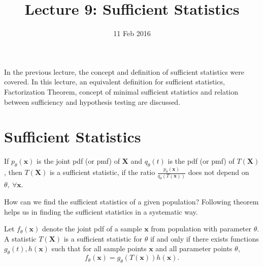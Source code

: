 \documentclass[a4paper,english,12pt]{article}
\title{Lecture 9: Sufficient Statistics}
\date{11 Feb 2016}
\author{}
\newcommand{\bx}{\mathbf{x}}
\newcommand{\bX}{\mathbf{X}}
\begin{document}
\maketitle
In the previous lecture, the concept and definition of sufficient statistics were covered. In this lecture, an equivalent definition for sufficient statistics, Factorization Theorem, concept of minimal sufficient statistics and relation between sufficiency and hypothesis testing are discussed.
\section{Sufficient Statistics}
\begin{defn} 
If $p_\theta(\bx)$ is the joint pdf (or pmf) of $\bX$ and $q_\theta(t)$ is the pdf (or pmf) of $T(\bX)$, then $T(\bX)$ is a sufficient statistic, if the ratio $\frac{p_\theta (\bx)}{q_\theta (T(\bx))}$ does not depend on $\theta,~ \forall \bx $.
\end{defn}
How can we find the sufficient statistics of a given population? Following theorem helps us in finding the sufficient statistics in a systematic way.
\begin{thm}
 Let $f_\theta (\bx)$ denote the joint pdf of a sample $\bx$ from population with parameter $\theta$. A statistic $T(\bX)$ is a sufficient statistic for $\theta$ if and only if there exists functions $g_\theta (t), h(\bx)$ such that for all sample points $\bx$ and all parameter points $\theta$, 
\begin{equation}	\label{eq:thm1}
f_\theta(\bx)=g_\theta(T(\bx))h(\bx). 
\end{equation}
\end{thm}
\end{document}
